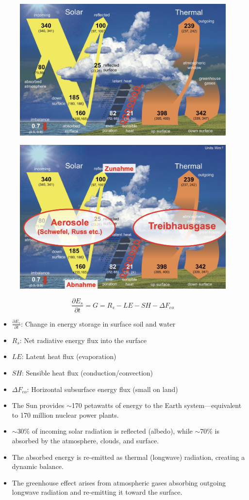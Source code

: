 \documentclass[fontsize=8pt, a4paper, landscape, fleqn]{scrartcl}
\begin{document}
\begin{multicols*}{3}[\raggedcolumns]
\begin{figure}[H]
        \centering
        \includegraphics[width=0.75\linewidth]{CS//img/Basic_energy balance.png}
    \end{figure}
\begin{figure}[H]
    \centering
    \includegraphics[width=.8\linewidth]{CS/img/Strahlungshaushalt.png}
\end{figure}
\[
\frac{\partial E_s}{\partial t} = G = R_s - LE - SH - \Delta F_{eo}
\]

\begin{itemize}
  \item $\frac{\partial E_s}{\partial t}$: Change in energy storage in surface soil and water
  \item $R_s$: Net radiative energy flux into the surface
  \item $LE$: Latent heat flux (evaporation)
  \item $SH$: Sensible heat flux (conduction/convection)
  \item $\Delta F_{eo}$: Horizontal subsurface energy flux (small on land)
\end{itemize}
\begin{itemize}
    \item The Sun provides $\sim$170 petawatts of energy to the Earth system—equivalent to 170 million nuclear power plants.
        \item $\sim$30\% of incoming solar radiation is reflected (albedo), while $\sim$70\% is absorbed by the atmosphere, clouds, and surface.
    \item The absorbed energy is re-emitted as thermal (longwave) radiation, creating a dynamic balance.
    \item The greenhouse effect arises from atmospheric gases absorbing outgoing longwave radiation and re-emitting it toward the surface.
\end{itemize}


\end{multicols*}
\end{document}
